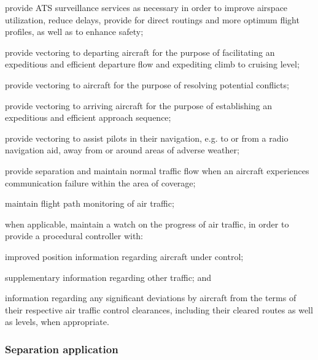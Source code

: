 \begin{enumalph}
    \item provide ATS surveillance services as necessary in order to improve airspace utilization, reduce delays, provide for direct routings and more optimum flight profiles, as well as to enhance safety;
    \item provide vectoring to departing aircraft for the purpose of facilitating an expeditious and efficient departure flow and expediting climb to cruising level;
    \item provide vectoring to aircraft for the purpose of resolving potential conflicts;
    \item provide vectoring to arriving aircraft for the purpose of establishing an expeditious and efficient approach sequence;
    \item provide vectoring to assist pilots in their navigation, e.g. to or from a radio navigation aid, away from or around areas of adverse weather;
    \item provide separation and maintain normal traffic flow when an aircraft experiences communication failure within the area of coverage;
    \item maintain flight path monitoring of air traffic;
    \item when applicable, maintain a watch on the progress of air traffic, in order to provide a procedural controller with:
    
    \begin{enumroman}
        \item improved position information regarding aircraft under control;
        \item supplementary information regarding other traffic; and
        \item information regarding any significant deviations by aircraft from the terms of their respective air traffic control clearances, including their cleared routes as well as levels, when appropriate.
    \end{enumroman}
\end{enumalph}

\subsubsection{Separation application}

